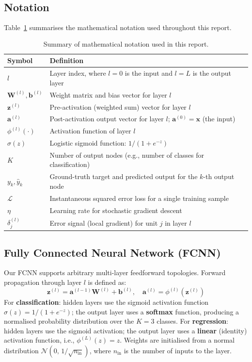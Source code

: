 \documentclass[11pt,a4paper]{article}
\begin{document}
\subsection{Notation}
Table~\ref{tab:notation} summarises the mathematical notation used throughout this report.
\begin{table}[H]
\centering
\caption{Summary of mathematical notation used in this report.}
\label{tab:notation}
\begin{tabular}{lp{12cm}}
\toprule
Symbol & Definition \\
\midrule
$l$ & Layer index, where $l=0$ is the input and $l=L$ is the output layer \\
$\mathbf{W}^{(l)}, \mathbf{b}^{(l)}$ & Weight matrix and bias vector for layer $l$ \\
$\mathbf{z}^{(l)}$ & Pre-activation (weighted sum) vector for layer $l$ \\
$\mathbf{a}^{(l)}$ & Post-activation output vector for layer $l$; $\mathbf{a}^{(0)} = \mathbf{x}$ (the input) \\
$\phi^{(l)}(\cdot)$ & Activation function of layer $l$ \\
$\sigma(z)$ & Logistic sigmoid function: $1 / (1 + e^{-z})$ \\
$K$ & Number of output nodes (e.g., number of classes for classification) \\
$y_k, \hat{y}_k$ & Ground-truth target and predicted output for the $k$-th output node \\
$\mathcal{L}$ & Instantaneous squared error loss for a single training sample \\
$\eta$ & Learning rate for stochastic gradient descent \\
$\delta^{(l)}_j$ & Error signal (local gradient) for unit $j$ in layer $l$ \\
\bottomrule
\end{tabular}
\end{table}

\subsection{Fully Connected Neural Network (FCNN)}
Our FCNN supports arbitrary multi-layer feedforward topologies. Forward propagation through layer $l$ is defined as:
\begin{equation}
\mathbf{z}^{(l)} = \mathbf{a}^{(l-1)}\mathbf{W}^{(l)} + \mathbf{b}^{(l)}, \quad \mathbf{a}^{(l)} = \phi^{(l)}(\mathbf{z}^{(l)})
\end{equation}
For \textbf{classification}: hidden layers use the sigmoid activation function $\sigma(z)=1/(1+e^{-z})$; the output layer uses a \textbf{softmax} function, producing a normalised probability distribution over the $K=3$ classes. 
For \textbf{regression}: hidden layers use the sigmoid activation; the output layer uses a \textbf{linear} (identity) activation function, i.e., $\phi^{(L)}(z) = z$. 
Weights are initialised from a normal distribution $\mathcal{N}(0,\,1/\sqrt{n_{\text{in}}})$, where $n_{\text{in}}$ is the number of inputs to the layer.
\end{document}
